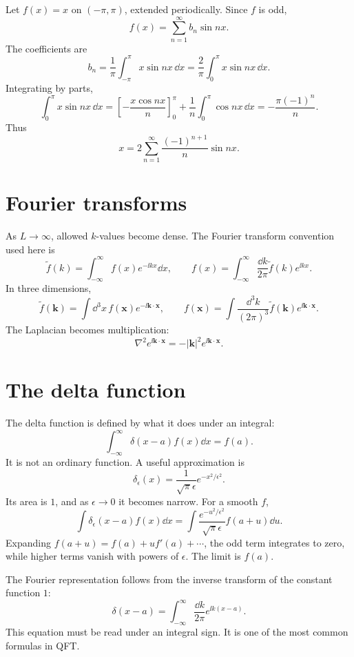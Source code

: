 \begin{example}
Let \(f(x)=x\) on \((-\pi,\pi)\), extended periodically.  Since \(f\) is odd,
\[
  f(x)=\sum_{n=1}^{\infty}b_n\sin nx.
\]
The coefficients are
\[
  b_n=\frac1\pi\int_{-\pi}^{\pi}x\sin nx\,\dd x
  =\frac2\pi\int_0^\pi x\sin nx\,\dd x.
\]
Integrating by parts,
\[
  \int_0^\pi x\sin nx\,\dd x
  =
  \left[-\frac{x\cos nx}{n}\right]_0^\pi
  +\frac1n\int_0^\pi\cos nx\,\dd x
  =
  -\frac{\pi(-1)^n}{n}.
\]
Thus
\[
  x=2\sum_{n=1}^\infty \frac{(-1)^{n+1}}{n}\sin nx.
\]
\end{example}

\section{Fourier transforms}

As \(L\to\infty\), allowed \(k\)-values become dense.  The Fourier transform convention used here is
\[
  \tilde f(k)=\int_{-\infty}^{\infty}f(x)e^{-\ii kx}\dd x,
  \qquad
  f(x)=\int_{-\infty}^{\infty}\frac{\dd k}{2\pi}\tilde f(k)e^{\ii kx}.
\]
In three dimensions,
\[
  \tilde f(\bm k)=\int \dd^3x\,f(\bm x)e^{-\ii\bm k\cdot\bm x},
  \qquad
  f(\bm x)=\int\frac{\dd^3k}{(2\pi)^3}\tilde f(\bm k)e^{\ii\bm k\cdot\bm x}.
\]
The Laplacian becomes multiplication:
\[
  \nabla^2 e^{\ii\bm k\cdot\bm x}=-|\bm k|^2e^{\ii\bm k\cdot\bm x}.
\]

\section{The delta function}

The delta function is defined by what it does under an integral:
\[
  \int_{-\infty}^{\infty}\delta(x-a)f(x)\dd x=f(a).
\]
It is not an ordinary function.  A useful approximation is
\[
  \delta_\epsilon(x)=\frac{1}{\sqrt{\pi}\epsilon}e^{-x^2/\epsilon^2}.
\]
Its area is \(1\), and as \(\epsilon\to0\) it becomes narrow.  For a smooth \(f\),
\[
  \int \delta_\epsilon(x-a)f(x)\dd x
  =
  \int \frac{e^{-u^2/\epsilon^2}}{\sqrt{\pi}\epsilon}
  f(a+u)\dd u.
\]
Expanding \(f(a+u)=f(a)+u f'(a)+\cdots\), the odd term integrates to zero, while higher terms vanish with powers of \(\epsilon\).  The limit is \(f(a)\).

The Fourier representation follows from the inverse transform of the constant function \(1\):
\[
  \delta(x-a)
  =
  \int_{-\infty}^{\infty}\frac{\dd k}{2\pi}e^{\ii k(x-a)}.
\]
This equation must be read under an integral sign.  It is one of the most common formulas in QFT.

